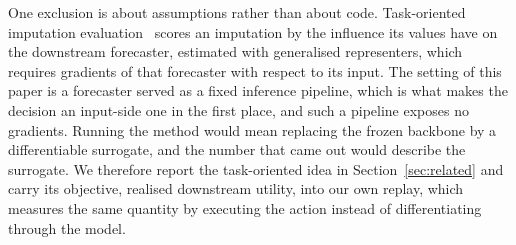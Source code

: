 \documentclass{article}
\begin{document}
One exclusion is about assumptions rather than about code. Task-oriented imputation
evaluation~\citep{wang2024taskoriented} scores an imputation by the influence its values have
on the downstream forecaster, estimated with generalised representers, which requires gradients
of that forecaster with respect to its input. The setting of this paper is a forecaster served
as a fixed inference pipeline, which is what makes the decision an input-side one in the first
place, and such a pipeline exposes no gradients. Running the method would mean replacing the
frozen backbone by a differentiable surrogate, and the number that came out would describe the
surrogate. We therefore report the task-oriented idea in Section~\ref{sec:related} and carry
its objective, realised downstream utility, into our own replay, which measures the same
quantity by executing the action instead of differentiating through the model.
\end{document}
